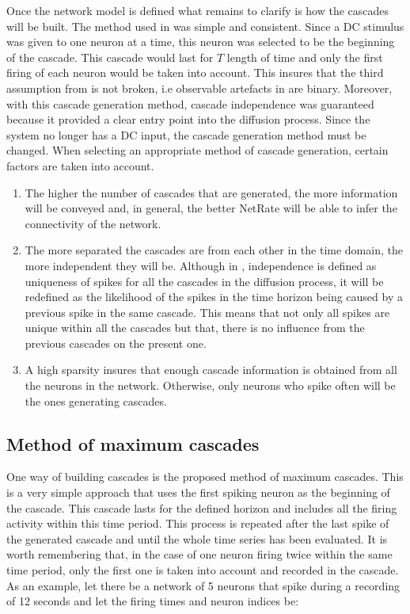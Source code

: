 Once the network model is defined what remains to clarify is how the cascades will be built. The method used in \cite{alexandru2018estimating} was simple and consistent. Since a DC stimulus was given to one neuron at a time, this neuron was selected to be the beginning of the cascade. This cascade would last for \(T\) length of time and only the first firing of each neuron would be taken into account. This insures that the third assumption from \cite{rodriguez2011uncovering} is not broken, i.e observable artefacts in are binary. Moreover, with this cascade generation method, cascade independence was guaranteed because it provided a clear entry point into the diffusion process. Since the system no longer has a DC input, the cascade generation method must be changed. When selecting an appropriate method of cascade generation, certain factors are taken into account.
\begin{enumerate}
\item The higher the number of cascades that are generated, the more information will be conveyed and, in general, the better NetRate will be able to infer the connectivity of the network. 
\item The more separated the cascades are from each other in the time domain, the more independent they will be. Although in \cite{rodriguez2011uncovering}, independence is defined as uniqueness of spikes for all the cascades in the diffusion process, it will be redefined as the likelihood of the spikes in the time horizon being caused by a previous spike in the same cascade. This means that not only all spikes are unique within all the cascades but that, there is no influence from the previous cascades on the present one.
\item A high sparsity insures that enough cascade information is obtained from all the neurons in the network. Otherwise, only neurons who spike often will be the ones generating cascades.
\end{enumerate}

\subsection{Method of maximum cascades}

One way of building cascades is the proposed method of maximum cascades. This is a very simple approach that uses the first spiking neuron as the beginning of the cascade. This cascade lasts for the defined horizon and includes all the firing activity within this time period. This process is repeated after the last spike of the generated cascade and until the whole time series has been evaluated. It is worth remembering that, in the case of one neuron firing twice within the same time period, only the first one is taken into account and recorded in the cascade. As an example, let there be a network of 5 neurons that spike during a recording of 12 seconds and let the firing times and neuron indices be:

